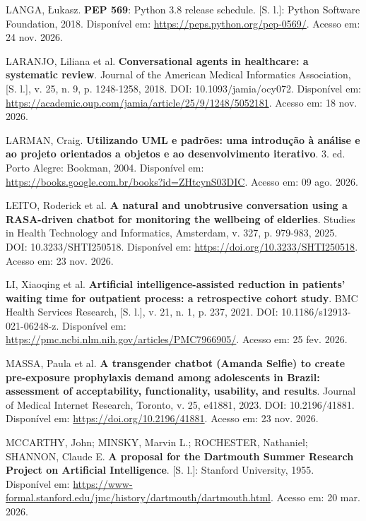 \documentclass[12pt,a4paper]{extarticle}
\begin{document}
\vspace{0.5cm}\noindent
LANGA, \L{}ukasz. \textbf{PEP 569}: Python 3.8 release schedule. [S. l.]: Python Software Foundation, 2018. Disponível em: \url{https://peps.python.org/pep-0569/}. Acesso em: 24 nov. 2026.

\vspace{0.5cm}\noindent
LARANJO, Liliana et al. \textbf{Conversational agents in healthcare: a systematic review}. Journal of the American Medical Informatics Association, [S. l.], v. 25, n. 9, p. 1248-1258, 2018. DOI: 10.1093/jamia/ocy072. Disponível em: \url{https://academic.oup.com/jamia/article/25/9/1248/5052181}. Acesso em: 18 nov. 2026.

\vspace{0.5cm}\noindent
LARMAN, Craig. \textbf{Utilizando UML e padrões: uma introdução à análise e ao projeto orientados a objetos e ao desenvolvimento iterativo}. 3. ed. Porto Alegre: Bookman, 2004. Disponível em: \url{https://books.google.com.br/books?id=ZHtcynS03DIC}. Acesso em: 09 ago. 2026.

\vspace{0.5cm}\noindent
LEITO, Roderick et al. \textbf{A natural and unobtrusive conversation using a RASA-driven chatbot for monitoring the wellbeing of elderlies}. Studies in Health Technology and Informatics, Amsterdam, v. 327, p. 979-983, 2025. DOI: 10.3233/SHTI250518. Disponível em: \url{https://doi.org/10.3233/SHTI250518}. Acesso em: 23 nov. 2026.

\vspace{0.5cm}\noindent
LI, Xiaoqing et al. \textbf{Artificial intelligence-assisted reduction in patients' waiting time for outpatient process: a retrospective cohort study}. BMC Health Services Research, [S. l.], v. 21, n. 1, p. 237, 2021. DOI: 10.1186/s12913-021-06248-z. Disponível em: \url{https://pmc.ncbi.nlm.nih.gov/articles/PMC7966905/}. Acesso em: 25 fev. 2026.

\vspace{0.5cm}\noindent
MASSA, Paula et al. \textbf{A transgender chatbot (Amanda Selfie) to create pre-exposure prophylaxis demand among adolescents in Brazil: assessment of acceptability, functionality, usability, and results}. Journal of Medical Internet Research, Toronto, v. 25, e41881, 2023. DOI: 10.2196/41881. Disponível em: \url{https://doi.org/10.2196/41881}. Acesso em: 23 nov. 2026.

\vspace{0.5cm}\noindent
MCCARTHY, John; MINSKY, Marvin L.; ROCHESTER, Nathaniel; SHANNON, Claude E. \textbf{A proposal for the Dartmouth Summer Research Project on Artificial Intelligence}. [S. l.]: Stanford University, 1955. Disponível em: \url{https://www-formal.stanford.edu/jmc/history/dartmouth/dartmouth.html}. Acesso em: 20 mar. 2026.
\end{document}
